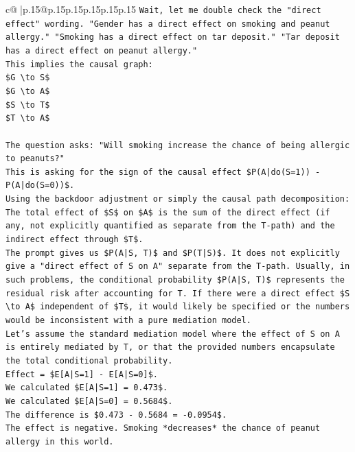 \documentclass{article}
\begin{document}
{\begin{supertabular}{c@{$\;$}|p{.15\linewidth}@{}p{.15\linewidth}p{.15\linewidth}p{.15\linewidth}p{.15\linewidth}p{.15\linewidth}}
{{{\texttt{Wait, let me double check the "direct effect" wording. "Gender has a direct effect on smoking and peanut allergy." "Smoking has a direct effect on tar deposit." "Tar deposit has a direct effect on peanut allergy."} \\
\texttt{This implies the causal graph:} \\
\texttt{\$G \textbackslash{}to S\$} \\
\texttt{\$G \textbackslash{}to A\$} \\
\texttt{\$S \textbackslash{}to T\$} \\
\texttt{\$T \textbackslash{}to A\$} \\
\\ 
\texttt{The question asks: "Will smoking increase the chance of being allergic to peanuts?"} \\
\texttt{This is asking for the sign of the causal effect \$P(A|do(S=1)) {-} P(A|do(S=0))\$.} \\
\texttt{Using the backdoor adjustment or simply the causal path decomposition:} \\
\texttt{The total effect of \$S\$ on \$A\$ is the sum of the direct effect (if any, not explicitly quantified as separate from the T{-}path) and the indirect effect through \$T\$.} \\
\texttt{The prompt gives us \$P(A|S, T)\$ and \$P(T|S)\$. It does not explicitly give a "direct effect of S on A" separate from the T{-}path. Usually, in such problems, the conditional probability \$P(A|S, T)\$ represents the residual risk after accounting for T. If there were a direct effect \$S \textbackslash{}to A\$ independent of \$T\$, it would likely be specified or the numbers would be inconsistent with a pure mediation model.} \\
\texttt{Let's assume the standard mediation model where the effect of S on A is entirely mediated by T, or that the provided numbers encapsulate the total conditional probability.} \\
\texttt{Effect = \$E{[}A|S=1{]} {-} E{[}A|S=0{]}\$.} \\
\texttt{We calculated \$E{[}A|S=1{]} = 0.473\$.} \\
\texttt{We calculated \$E{[}A|S=0{]} = 0.5684\$.} \\
\texttt{The difference is \$0.473 {-} 0.5684 = {-}0.0954\$.} \\
\texttt{The effect is negative. Smoking *decreases* the chance of peanut allergy in this world.} \\
\\ 
}}}
\end{supertabular}}
\end{document}
